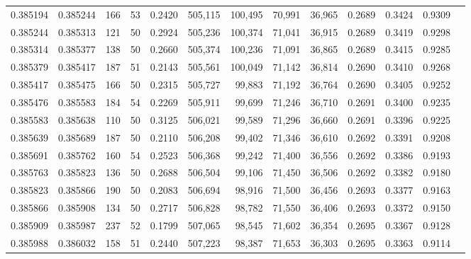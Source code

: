 \begin{tabular}{rrrrrrrrrrrrr}
0.385194 & 0.385244 &   166 &  53 &                                     0.2420 & 505,115 & 100,495 &  70,991 &  36,965 & 0.2689 & 0.3424 & 0.9309 \\
0.385244 & 0.385313 &   121 &  50 &                                     0.2924 & 505,236 & 100,374 &  71,041 &  36,915 & 0.2689 & 0.3419 & 0.9298 \\
0.385314 & 0.385377 &   138 &  50 &                                     0.2660 & 505,374 & 100,236 &  71,091 &  36,865 & 0.2689 & 0.3415 & 0.9285 \\
0.385379 & 0.385417 &   187 &  51 &                                     0.2143 & 505,561 & 100,049 &  71,142 &  36,814 & 0.2690 & 0.3410 & 0.9268 \\
0.385417 & 0.385475 &   166 &  50 &                                     0.2315 & 505,727 &  99,883 &  71,192 &  36,764 & 0.2690 & 0.3405 & 0.9252 \\
0.385476 & 0.385583 &   184 &  54 &                                     0.2269 & 505,911 &  99,699 &  71,246 &  36,710 & 0.2691 & 0.3400 & 0.9235 \\
0.385583 & 0.385638 &   110 &  50 &                                     0.3125 & 506,021 &  99,589 &  71,296 &  36,660 & 0.2691 & 0.3396 & 0.9225 \\
0.385639 & 0.385689 &   187 &  50 &                                     0.2110 & 506,208 &  99,402 &  71,346 &  36,610 & 0.2692 & 0.3391 & 0.9208 \\
0.385691 & 0.385762 &   160 &  54 &                                     0.2523 & 506,368 &  99,242 &  71,400 &  36,556 & 0.2692 & 0.3386 & 0.9193 \\
0.385763 & 0.385823 &   136 &  50 &                                     0.2688 & 506,504 &  99,106 &  71,450 &  36,506 & 0.2692 & 0.3382 & 0.9180 \\
0.385823 & 0.385866 &   190 &  50 &                                     0.2083 & 506,694 &  98,916 &  71,500 &  36,456 & 0.2693 & 0.3377 & 0.9163 \\
0.385866 & 0.385908 &   134 &  50 &                                     0.2717 & 506,828 &  98,782 &  71,550 &  36,406 & 0.2693 & 0.3372 & 0.9150 \\
0.385909 & 0.385987 &   237 &  52 &                                     0.1799 & 507,065 &  98,545 &  71,602 &  36,354 & 0.2695 & 0.3367 & 0.9128 \\
0.385988 & 0.386032 &   158 &  51 &                                     0.2440 & 507,223 &  98,387 &  71,653 &  36,303 & 0.2695 & 0.3363 & 0.9114 \\

\end{tabular}
